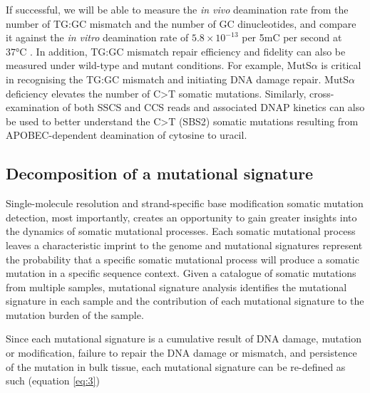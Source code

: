 If successful, we will be able to measure the \textit{in vivo} deamination rate from the number of TG:GC mismatch and the number of GC dinucleotides, and compare it against the \textit{in vitro} deamination rate of $5.8\times10^{-13}$ per 5mC per second at 37°C \cite{Shen1994-of}. In addition, TG:GC mismatch repair efficiency and fidelity can also be measured under wild-type and mutant conditions. For example, MutS$\alpha$ is critical in recognising the TG:GC mismatch and initiating DNA damage repair. MutS$\alpha$ deficiency elevates the number of C>T somatic mutations. Similarly, cross-examination of both SSCS and CCS reads and associated DNAP kinetics can also be used to better understand the C>T (SBS2) somatic mutations resulting from APOBEC-dependent deamination of cytosine to uracil.  

\subsection{Decomposition of a mutational signature}

Single-molecule resolution and strand-specific base modification somatic mutation detection, most importantly, creates an opportunity to gain greater insights into the dynamics of somatic mutational processes. Each somatic mutational process leaves a characteristic imprint to the genome and mutational signatures represent the probability that a specific somatic mutational process will produce a somatic mutation in a specific sequence context. Given a catalogue of somatic mutations from multiple samples, mutational signature analysis identifies the mutational signature in each sample and the contribution of each mutational signature to the mutation burden of the sample.

Since each mutational signature is a cumulative result of DNA damage, mutation or modification, failure to repair the DNA damage or mismatch, and persistence of the mutation in bulk tissue, each mutational signature can be re-defined as such (equation \ref{eq:3})

